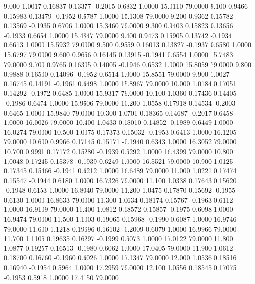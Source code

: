    9.000   1.0017   0.16837   0.13377  -0.2015   0.6832   1.0000  15.0110  79.0000
   9.100   0.9466   0.15983   0.13479  -0.1952   0.6787   1.0000  15.1308  79.0000
   9.200   0.9362   0.15782   0.13569  -0.1935   0.6706   1.0000  15.3460  79.0000
   9.300   0.9403   0.15823   0.13656  -0.1933   0.6654   1.0000  15.4847  79.0000
   9.400   0.9473   0.15905   0.13742  -0.1934   0.6613   1.0000  15.5932  79.0000
   9.500   0.9559   0.16013   0.13827  -0.1937   0.6580   1.0000  15.6797  79.0000
   9.600   0.9656   0.16145   0.13915  -0.1941   0.6554   1.0000  15.7483  79.0000
   9.700   0.9765   0.16305   0.14005  -0.1946   0.6532   1.0000  15.8059  79.0000
   9.800   0.9888   0.16500   0.14096  -0.1952   0.6514   1.0000  15.8551  79.0000
   9.900   1.0027   0.16745   0.14191  -0.1961   0.6498   1.0000  15.8967  79.0000
  10.000   1.0184   0.17051   0.14292  -0.1972   0.6485   1.0000  15.9317  79.0000
  10.100   1.0360   0.17436   0.14405  -0.1986   0.6474   1.0000  15.9606  79.0000
  10.200   1.0558   0.17918   0.14534  -0.2003   0.6465   1.0000  15.9840  79.0000
  10.300   1.0701   0.18365   0.14687  -0.2017   0.6458   1.0000  16.0026  79.0000
  10.400   1.0433   0.18010   0.14852  -0.1989   0.6449   1.0000  16.0274  79.0000
  10.500   1.0075   0.17373   0.15032  -0.1953   0.6413   1.0000  16.1205  79.0000
  10.600   0.9966   0.17145   0.15171  -0.1940   0.6343   1.0000  16.3052  79.0000
  10.700   0.9991   0.17172   0.15280  -0.1939   0.6292   1.0000  16.4399  79.0000
  10.800   1.0048   0.17245   0.15378  -0.1939   0.6249   1.0000  16.5521  79.0000
  10.900   1.0125   0.17345   0.15466  -0.1941   0.6212   1.0000  16.6489  79.0000
  11.000   1.0221   0.17474   0.15547  -0.1944   0.6180   1.0000  16.7326  79.0000
  11.100   1.0338   0.17643   0.15620  -0.1948   0.6153   1.0000  16.8040  79.0000
  11.200   1.0475   0.17870   0.15692  -0.1955   0.6130   1.0000  16.8633  79.0000
  11.300   1.0634   0.18174   0.15767  -0.1963   0.6112   1.0000  16.9109  79.0000
  11.400   1.0812   0.18572   0.15857  -0.1975   0.6098   1.0000  16.9474  79.0000
  11.500   1.1003   0.19065   0.15968  -0.1990   0.6087   1.0000  16.9746  79.0000
  11.600   1.1218   0.19696   0.16102  -0.2009   0.6079   1.0000  16.9966  79.0000
  11.700   1.1106   0.19635   0.16297  -0.1999   0.6073   1.0000  17.0122  79.0000
  11.800   1.0877   0.19257   0.16513  -0.1980   0.6062   1.0000  17.0405  79.0000
  11.900   1.0612   0.18700   0.16760  -0.1960   0.6026   1.0000  17.1347  79.0000
  12.000   1.0536   0.18516   0.16940  -0.1954   0.5964   1.0000  17.2959  79.0000
  12.100   1.0556   0.18545   0.17075  -0.1953   0.5918   1.0000  17.4150  79.0000
